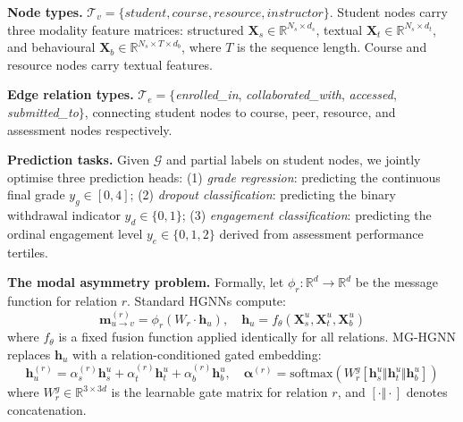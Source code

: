 \documentclass[sigconf,review]{acmart}
\begin{document}
\textbf{Node types.}
$\mathcal{T}_v = \{\textit{student}, \textit{course},
\textit{resource}, \textit{instructor}\}$.
Student nodes carry three modality feature matrices:
structured $\mathbf{X}_s \in \mathbb{R}^{N_s \times d_s}$,
textual $\mathbf{X}_t \in \mathbb{R}^{N_s \times d_t}$,
and behavioural $\mathbf{X}_b \in \mathbb{R}^{N_s
\times T \times d_b}$, where $T$ is the sequence
length. Course and resource nodes carry textual features.

\textbf{Edge relation types.}
$\mathcal{T}_e = \{$\textit{enrolled\_in},
\textit{collaborated\_with}, \textit{accessed},
\textit{submitted\_to}$\}$, connecting student nodes
to course, peer, resource, and assessment nodes
respectively.

\textbf{Prediction tasks.}
Given $\mathcal{G}$ and partial labels on student
nodes, we jointly optimise three prediction heads:
(1) \textit{grade regression}: predicting the
continuous final grade $y_g \in [0, 4]$;
(2) \textit{dropout classification}: predicting the
binary withdrawal indicator $y_d \in \{0, 1\}$;
(3) \textit{engagement classification}: predicting
the ordinal engagement level $y_e \in \{0, 1, 2\}$
derived from assessment performance tertiles.

\textbf{The modal asymmetry problem.}
Formally, let $\phi_r : \mathbb{R}^d \to \mathbb{R}^d$
be the message function for relation $r$. Standard
HGNNs compute:
\begin{equation}
  \mathbf{m}_{u \to v}^{(r)} = \phi_r\!\left(
  W_r \cdot \mathbf{h}_u \right),
  \quad \mathbf{h}_u = f_\theta(\mathbf{X}_s^u,
  \mathbf{X}_t^u, \mathbf{X}_b^u)
  \label{eq:standard}
\end{equation}
where $f_\theta$ is a fixed fusion function applied
identically for all relations. MG-HGNN replaces
$\mathbf{h}_u$ with a relation-conditioned gated
embedding:
\begin{equation}
  \mathbf{h}_u^{(r)} = \alpha_s^{(r)} \mathbf{h}_s^u
  + \alpha_t^{(r)} \mathbf{h}_t^u
  + \alpha_b^{(r)} \mathbf{h}_b^u,
  \quad \boldsymbol{\alpha}^{(r)} =
  \text{softmax}\!\left(W_r^g [\mathbf{h}_s^u
  \Vert \mathbf{h}_t^u \Vert \mathbf{h}_b^u]\right)
  \label{eq:gate}
\end{equation}
where $W_r^g \in \mathbb{R}^{3 \times 3d}$ is the
learnable gate matrix for relation $r$, and
$[\cdot \Vert \cdot]$ denotes concatenation.
\end{document}

